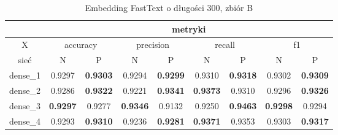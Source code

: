 \begin{table}[p]  \centering
    \caption{Embedding FastText o długości 300, zbiór B}
    \label{tab:wyniki_fasttext_B}
    \begin{tabular} {|c|c|c|c|c|c|c|c|c| }    \hline
                 & \multicolumn{8}{c|}{metryki}                                                                                                                                                                                                                                                \\ \hline
        X        & \multicolumn{2}{c|}{accuracy} & \multicolumn{2}{c|}{precision}      & \multicolumn{2}{c|}{recall}    & \multicolumn{2}{c|}{f1}                                                                                                                                              \\ \hline
        sieć     & N                             & P                                   & N                              & P                              & N                          & P                                   & N                          & P                                   \\ \hline
        dense\_1 & 0.9297                        & \textbf{0.9303}                     & 0.9294                         & \textbf{0.9299}                & 0.9310                     & \textbf{0.9318}                     & 0.9302                     & \textbf{0.9309}                     \\ \hline
        dense\_2 & 0.9286                        & \textbf{0.9322}                     & 0.9221                         & \textbf{0.9341}                & \textbf{0.9373}            & 0.9310                              & 0.9296                     & \textbf{0.9326}                     \\ \hline
        dense\_3 & \textbf{0.9297}               & 0.9277                              & \textbf{0.9346}                & 0.9132                         & 0.9250                     & \textbf{0.9463}                     & \textbf{0.9298}            & 0.9294                              \\ \hline
        dense\_4 & 0.9293                        & \textbf{0.9310}                     & 0.9236                         & \textbf{0.9281}                & \textbf{0.9371}            & 0.9353                              & 0.9303                     & \textbf{0.9317}                     \\ \hline

\end{tabular}
\end{table}
